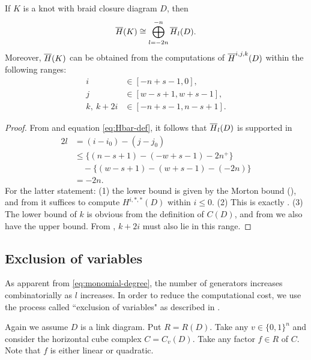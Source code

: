 \begin{proposition} \label{prop:finiteness}
    If $K$ is a knot with braid closure diagram $D$, then
    \[
        \overline{H}(K) \cong \bigoplus_{l = -2n}^{-n} \overline{H}_l(D).
    \]
    Moreover, $\overline{H}(K)$ can be obtained from the computations of $\overline{H}^{i, j, k}(D)$ within the following ranges:
    \begin{align*}
        i &\in [-n + s - 1, 0], \tag{1}\\
        j &\in [w - s + 1, w + s - 1], \tag{2}\\
        k,\ k + 2i &\in [-n + s - 1, n - s + 1]. \tag{3}
    \end{align*}
\end{proposition}

\begin{proof}
    From  and equation \eqref{eq:Hbar-def}, it follows that $\overline{H}_l(D)$ is supported in 
    \begin{align*}
        2l 
        &= (i - i_0) - (j - j_0) \\ 
        &\leq \{ (n - s + 1) - (-w + s - 1) - 2n^+ \}\\
        &\quad - \{(w - s + 1) - (w + s - 1) - (-2n)\}\\
        &= -2n.
    \end{align*}
    For the latter statement: (1) the lower bound is given by the Morton bound (), and from  it suffices to compute $H^{i, *, *}(D)$ within $i \leq 0$.
    (2) This is exactly .
    (3) The lower bound of $k$ is obvious from the definition of $C(D)$, and from  we also have the upper bound. From , $k + 2i$ must also lie in this range.
\end{proof}

\subsection{Exclusion of variables}

As apparent from \eqref{eq:monomial-degree}, the number of generators increases combinatorially as $l$ increases. In order to reduce the computational cost, we use the process called ``exclusion of variables" as described in \cite[Lemma 3.8]{Ras15}. 

Again we assume $D$ is a link diagram. Put $R = R(D)$. Take any $v \in \{0, 1\}^n$ and consider the horizontal cube complex $C = C_v(D)$. Take any factor $f \in R$ of $C$. Note that $f$ is either linear or quadratic.

